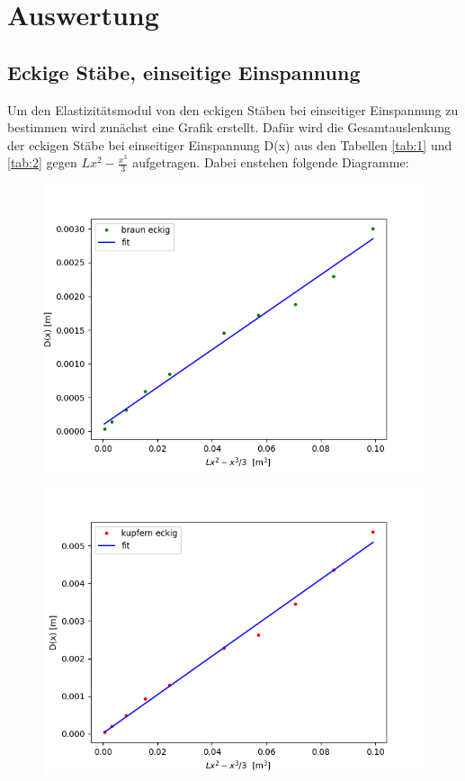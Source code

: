 \section{Auswertung}

\subsection{Eckige Stäbe, einseitige Einspannung}

Um den Elastizitätsmodul von den eckigen Stäben bei einseitiger Einspannung zu bestimmen wird zunächst eine Grafik erstellt. Dafür wird die Gesamtauslenkung der eckigen Stäbe bei einseitiger Einspannung D(x) aus den Tabellen \ref{tab:1} und \ref{tab:2} gegen $Lx^2-\frac{x^3}{3}$ aufgetragen. Dabei enstehen folgende Diagramme:

\begin{figure}[H]
    \centering
    \includegraphics{bee.png}
\end{figure}

\begin{figure}[H]
    \centering
    \includegraphics{kee.png}
\end{figure}

